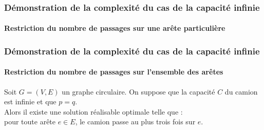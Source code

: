 \begin{frame}
  \frametitle{Démonstration de la complexité du cas de la capacité infinie}
  \framesubtitle{Restriction du nombre de passages sur une arête particulière}

  \begin{overlayarea}{\linewidth}{\columnwidth}
  \end{overlayarea}
\end{frame}

\begin{frame}
  \frametitle{Démonstration de la complexité du cas de la capacité infinie}
  \framesubtitle{Restriction du nombre de passages sur l'ensemble des arêtes}
  
  \begin{lem} \label{lem: passe au plus 3 fois par chaque e}
  Soit $G=(V,E)$ un graphe circulaire. On suppose que la capacité $C$ du camion est infinie et que $p=q$.\\
  Alors il existe une solution réalisable optimale telle que :\\
  pour toute arête $e \in E$, le camion passe au plus trois fois sur $e$.
  \end{lem}

\end{frame}

